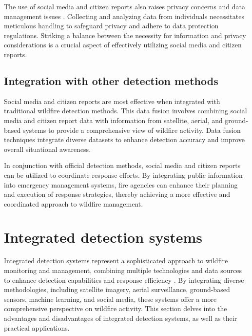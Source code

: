 \documentclass[
  12 pt,
]{Nemilov}
\begin{document}
The use of social media and citizen reports also raises privacy concerns and data management issues \citep{barbier2012maximizing, li2016crowdsourced, li2017crowdsourced}. Collecting and analyzing data from individuals necessitates meticulous handling to safeguard privacy and adhere to data protection regulations. Striking a balance between the necessity for information and privacy considerations is a crucial aspect of effectively utilizing social media and citizen reports.

\subsection{Integration with other detection methods}\label{integration-with-other-detection-methods}

Social media and citizen reports are most effective when integrated with traditional wildfire detection methods. This data fusion involves combining social media and citizen report data with information from satellite, aerial, and ground-based systems to provide a comprehensive view of wildfire activity. Data fusion techniques integrate diverse datasets to enhance detection accuracy and improve overall situational awareness.

In conjunction with official detection methods, social media and citizen reports can be utilized to coordinate response efforts. By integrating public information into emergency management systems, fire agencies can enhance their planning and execution of response strategies, thereby achieving a more effective and coordinated approach to wildfire management.

\section{Integrated detection systems}\label{integrated-detection-systems-1}

Integrated detection systems represent a sophisticated approach to wildfire monitoring and management, combining multiple technologies and data sources to enhance detection capabilities and response efficiency \citep{ambrosia1998integration}. By integrating diverse methodologies, including satellite imagery, aerial surveillance, ground-based sensors, machine learning, and social media, these systems offer a more comprehensive perspective on wildfire activity. This section delves into the advantages and disadvantages of integrated detection systems, as well as their practical applications.
\end{document}

